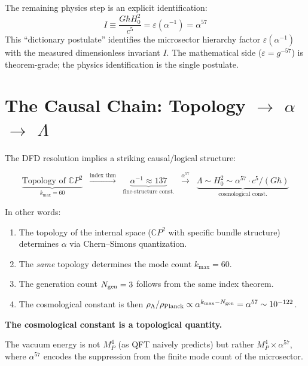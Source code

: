 \documentclass[11pt]{article}
\begin{document}
The remaining physics step is an explicit identification:
\begin{equation}
I \equiv \frac{G\hbar H_0^2}{c^5} = \varepsilon(\alpha^{-1}) = \alpha^{57}
\end{equation}
This ``dictionary postulate'' identifies the microsector hierarchy factor $\varepsilon(\alpha^{-1})$
with the measured dimensionless invariant $I$. The mathematical side ($\varepsilon = g^{-57}$)
is theorem-grade; the physics identification is the single postulate.

\section{The Causal Chain: Topology $\to$ $\alpha$ $\to$ $\Lambda$}

The DFD resolution implies a striking causal/logical structure:

\begin{equation}
\underbrace{\text{Topology of } \mathbb{C}P^2}_{k_{\max} = 60}
\;\;\xrightarrow{\text{index thm}}\;\;
\underbrace{\alpha^{-1} \approx 137}_{\text{fine-structure const.}}
\;\;\xrightarrow{\alpha^{57}}\;\;
\underbrace{\Lambda \sim H_0^2 \sim \alpha^{57} \cdot c^5/(G\hbar)}_{\text{cosmological const.}}
\end{equation}

In other words:
\begin{enumerate}
\item The topology of the internal space ($\mathbb{C}P^2$ with specific bundle structure)
determines $\alpha$ via Chern--Simons quantization.
\item The \emph{same} topology determines the mode count $k_{\max} = 60$.
\item The generation count $N_{\rm gen} = 3$ follows from the same index theorem.
\item The cosmological constant is then $\rho_\Lambda/\rho_{\rm Planck} \propto \alpha^{k_{\max} - N_{\rm gen}} = \alpha^{57} \sim 10^{-122}$.
\end{enumerate}

\textbf{The cosmological constant is a topological quantity.}

The vacuum energy is not $M_P^4$ (as QFT naively predicts) but rather
$M_P^4 \times \alpha^{57}$, where $\alpha^{57}$ encodes the suppression from the finite
mode count of the microsector.
\end{document}
